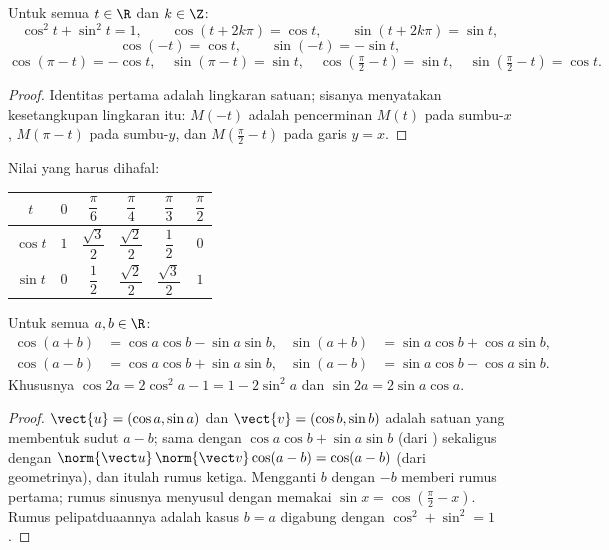 \begin{proposition}\label{prop:g12:trigo:identities}
Untuk semua $t \in \R$ dan $k \in \Z$:
\[
\cos^2 t + \sin^2 t = 1, \qquad
\cos(t + 2k\pi) = \cos t, \qquad
\sin(t + 2k\pi) = \sin t,
\]
\[
\cos(-t) = \cos t, \qquad \sin(-t) = -\sin t,
\]
\[
\cos(\pi - t) = -\cos t, \quad \sin(\pi - t) = \sin t, \quad
\cos\left(\tfrac{\pi}{2} - t\right) = \sin t, \quad
\sin\left(\tfrac{\pi}{2} - t\right) = \cos t .
\]
\end{proposition}

\begin{proof}
Identitas pertama adalah  lingkaran satuan; sisanya menyatakan
kesetangkupan lingkaran itu: $M(-t)$ adalah pencerminan $M(t)$ pada
sumbu-$x$, $M(\pi - t)$ pada sumbu-$y$, dan $M(\frac\pi2 - t)$ pada garis
$y = x$.
\end{proof}

Nilai yang harus dihafal:
\begin{center}
\begin{tabular}{c|ccccc}
$t$ & $0$ & $\dfrac{\pi}{6}$ & $\dfrac{\pi}{4}$ & $\dfrac{\pi}{3}$ & $\dfrac{\pi}{2}$\\[6pt]
\hline\rule{0pt}{14pt}%
$\cos t$ & $1$ & $\dfrac{\sqrt3}{2}$ & $\dfrac{\sqrt2}{2}$ & $\dfrac12$ & $0$\\[6pt]
$\sin t$ & $0$ & $\dfrac12$ & $\dfrac{\sqrt2}{2}$ & $\dfrac{\sqrt3}{2}$ & $1$
\end{tabular}
\end{center}

\begin{proposition}\label{prop:g12:trigo:addition}
Untuk semua $a, b \in \R$:
\begin{align*}
\cos(a+b) &= \cos a \cos b - \sin a \sin b, &
\sin(a+b) &= \sin a \cos b + \cos a \sin b,\\
\cos(a-b) &= \cos a \cos b + \sin a \sin b, &
\sin(a-b) &= \sin a \cos b - \cos a \sin b.
\end{align*}
Khususnya $\cos 2a = 2\cos^2 a - 1 = 1 - 2\sin^2 a$ dan
$\sin 2a = 2 \sin a \cos a$.
\end{proposition}

\begin{proof}
 $\vect{u} = (\cos a, \sin a)$ dan $\vect{v} = (\cos b, \sin b)$
adalah  satuan yang membentuk sudut $a - b$;  sama
dengan $\cos a\cos b + \sin a \sin b$ (dari ) sekaligus dengan
$\norm{\vect u}\,\norm{\vect v}\cos(a-b) = \cos(a - b)$ (dari geometrinya),
dan itulah rumus ketiga. Mengganti $b$ dengan $-b$ memberi rumus pertama;
rumus sinusnya menyusul dengan memakai $\sin x = \cos(\frac\pi2 - x)$. Rumus
pelipatduaannya adalah kasus $b = a$ digabung dengan $\cos^2 + \sin^2 = 1$.
\end{proof}

